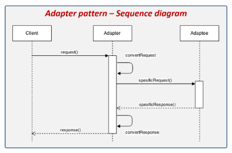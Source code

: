\begin{flushleft}
\begin{enumerate}[a)]
\end{enumerate}
         \begin{center}
	\includegraphics[width=10cm]{./Imagenes/adapter2} 
	\end{center}
\vfill


\end{flushleft}
